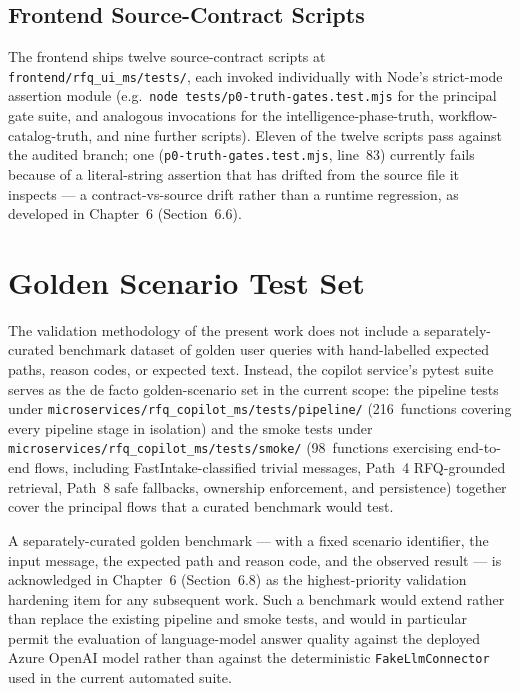 \subsection{Frontend Source-Contract Scripts}

The frontend ships twelve source-contract scripts at \texttt{frontend/rfq\_ui\_ms/tests/}, each invoked individually with Node's strict-mode assertion module (e.g.\ \texttt{node tests/p0-truth-gates.test.mjs} for the principal gate suite, and analogous invocations for the intelligence-phase-truth, workflow-catalog-truth, and nine further scripts). Eleven of the twelve scripts pass against the audited branch; one (\texttt{p0-truth-gates.test.mjs}, line~83) currently fails because of a literal-string assertion that has drifted from the source file it inspects --- a contract-vs-source drift rather than a runtime regression, as developed in Chapter~6 (Section~6.6).

\section{Golden Scenario Test Set}
\label{app:golden-scenarios}

The validation methodology of the present work does not include a separately-curated benchmark dataset of golden user queries with hand-labelled expected paths, reason codes, or expected text. Instead, the copilot service's pytest suite serves as the de facto golden-scenario set in the current scope: the pipeline tests under \texttt{microservices/rfq\_copilot\_ms/tests/pipeline/} (216~functions covering every pipeline stage in isolation) and the smoke tests under \texttt{microservices/rfq\_copilot\_ms/tests/smoke/} (98~functions exercising end-to-end flows, including FastIntake-classified trivial messages, Path~4 RFQ-grounded retrieval, Path~8 safe fallbacks, ownership enforcement, and persistence) together cover the principal flows that a curated benchmark would test.

A separately-curated golden benchmark --- with a fixed scenario identifier, the input message, the expected path and reason code, and the observed result --- is acknowledged in Chapter~6 (Section~6.8) as the highest-priority validation hardening item for any subsequent work. Such a benchmark would extend rather than replace the existing pipeline and smoke tests, and would in particular permit the evaluation of language-model answer quality against the deployed Azure OpenAI model rather than against the deterministic \texttt{FakeLlmConnector} used in the current automated suite.

